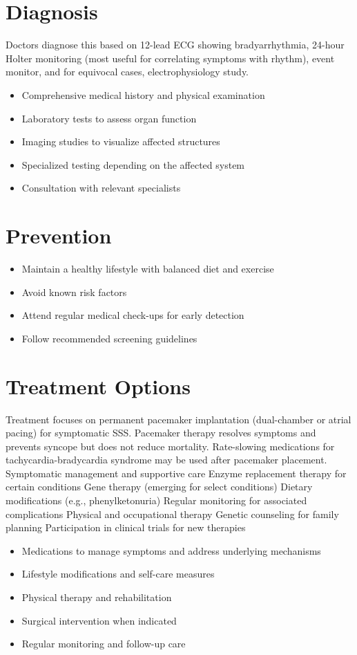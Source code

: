 \section{Diagnosis}
Doctors diagnose this based on 12-lead ECG showing bradyarrhythmia, 24-hour Holter monitoring (most useful for correlating symptoms with rhythm), event monitor, and for equivocal cases, electrophysiology study.

\begin{itemize}[noitemsep]
  \item Comprehensive medical history and physical examination
  \item Laboratory tests to assess organ function
  \item Imaging studies to visualize affected structures
  \item Specialized testing depending on the affected system
  \item Consultation with relevant specialists
\end{itemize}
\section{Prevention}
\begin{itemize}[noitemsep]
  \item Maintain a healthy lifestyle with balanced diet and exercise
  \item Avoid known risk factors
  \item Attend regular medical check-ups for early detection
  \item Follow recommended screening guidelines
\end{itemize}
\section{Treatment Options}
Treatment focuses on permanent pacemaker implantation (dual-chamber or atrial pacing) for symptomatic SSS. Pacemaker therapy resolves symptoms and prevents syncope but does not reduce mortality. Rate-slowing medications for tachycardia-bradycardia syndrome may be used after pacemaker placement. Symptomatic management and supportive care Enzyme replacement therapy for certain conditions Gene therapy (emerging for select conditions) Dietary modifications (e.g., phenylketonuria) Regular monitoring for associated complications Physical and occupational therapy Genetic counseling for family planning Participation in clinical trials for new therapies

\begin{itemize}[noitemsep]
  \item Medications to manage symptoms and address underlying mechanisms
  \item Lifestyle modifications and self-care measures
  \item Physical therapy and rehabilitation
  \item Surgical intervention when indicated
  \item Regular monitoring and follow-up care
\end{itemize}
